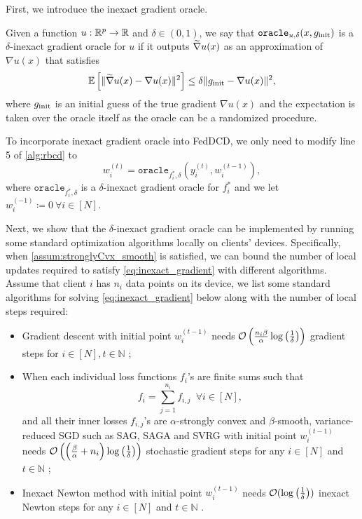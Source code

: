 First, we introduce the inexact gradient oracle. 
\begin{definition} 
Given a function $u : \mathbb{R}^p \to \mathbb{R}$ and $\delta \in (0,1)$, we say that $\texttt{oracle}_{u, \delta}(x, g_{\mathrm{init}})$ is a $\delta$-inexact gradient oracle for $u$ if it outputs $\widetilde{\nabla} u(x)$ as an approximation of $\nabla u(x)$ that satisfies
\begin{align}
        \mathbb{E}\left[\| \widetilde{\nabla} u(x) - {\nabla} u(x) \|^2\right] \leq \delta \| g_{\mathrm{init}} - {\nabla} u(x) \|^2, \label{eq:inexactOracle1}
\end{align}
where $g_{\mathrm{init}}$ is an initial guess of the true gradient $\nabla u(x)$ and the expectation is taken over the oracle itself as the oracle can be a randomized procedure.
\end{definition}
To incorporate inexact gradient oracle into FedDCD, we only need to modify line 5 of \autoref{alg:rbcd} to
\begin{equation} \label{eq:inexact_gradient}
    w_i^{(t)} = \texttt{oracle}_{f_i^*, \delta}(y^{(t)}_i, w_{i}^{(t-1)}),
\end{equation}
where $\texttt{oracle}_{f_i^*, \delta}$ is a $\delta$-inexact gradient oracle for $f_i^*$ and 
we let $w_i^{(-1)} \coloneqq 0~\forall i \in [N]$.

Next, we show that the $\delta$-inexact gradient oracle can be implemented by running some standard optimization algorithms locally on clients' devices. Specifically, when \autoref{assum:stronglyCvx_smooth} is satisfied, we can bound the number of local updates required to satisfy \autoref{eq:inexact_gradient} with different algorithms. Assume that client $i$ has $n_i$ data points on its device, we list some standard algorithms for solving \autoref{eq:inexact_gradient} below along with the number of local steps required:
\begin{itemize}
    \item Gradient descent with initial point $w_i^{(t-1)}$ needs $\mathcal{O}\left( \frac{ n_i \beta}{\alpha} \log\left( \frac{1}{\delta} \right) \right)$ gradient steps for $i \in [N], t \in \mathbb{N}$ \citep{cvxopt_lecture};
    \item When each individual loss functions $f_i$'s are finite sums such that 
    \[f_i = \sum_{j=1}^{n_i} f_{i,j} \enspace \forall i \in [N],\] 
    and all their inner losses $f_{i,j}$'s are $\alpha$-strongly convex and $\beta$-smooth, variance-reduced SGD such as SAG, SAGA and SVRG with initial point $w^{(t-1)}_i$ needs $\mathcal{O}\left( \left( \frac{\beta}{\alpha} + n_i \right) \log\left( \frac{1}{\delta} \right) \right)$ stochastic gradient steps for any $i \in [N]$ and $t \in \mathbb{N}$ \citep{roux2012stochastic,JohnsonZ13,DefazioBL14};
    \item Inexact Newton method with initial point $w^{(t-1)}_i$ needs $\mathcal{O}( \log\left( \frac{1}{\delta} \right) )$ inexact Newton steps for any $i \in [N] $ and $t \in \mathbb{N}$ \citep{dembo1982inexact}.
\end{itemize}

